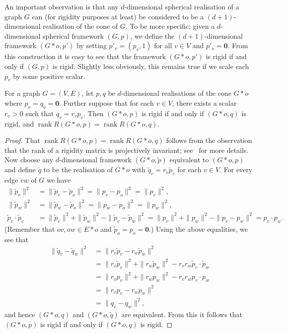 \documentclass[ALCO]{cedram}
\DeclareMathOperator{\rank}{rank}
\begin{document}
An important observation is that any $d$-dimensional spherical realisation of a graph $G$ can (for rigidity purposes at least) be considered to be a $(d+1)$-dimensional realisation of the cone of $G$.
To be more specific:
given a $d$-dimensional spherical framework $(G,p)$,
we define the $(d+1)$-dimensional framework $(G*o,p')$ by setting $p'_v=(p_v,1)$ for all $v \in V$ and $p'_o = \mathbf{0}$.
From this construction it is easy to see that the framework $(G*o,p')$ is rigid if and only if $(G,p)$ is rigid.
Slightly less obviously,
this remains true if we scale each $p_v$ by some positive scalar.

\begin{proposition}\label{p:slide}
	For a graph $G=(V,E)$,
	let $p,q$ be $d$-dimensional realisations of the cone $G*o$ where $p_o=q_o = \mathbf{0}$.
	Further suppose that for each $v \in V$,
	there exists a scalar $r_v >0$ such that $q_v = r_v p_v$.
	Then $(G*o,p)$ is rigid if and only if $(G*o,q)$ is rigid,
	and $\rank R(G*o,p) = \rank R(G*o,q)$.
\end{proposition}

\begin{proof}
	That $\rank R(G*o,p) = \rank R(G*o,q)$ follows from the observation that the rank of a rigidity matrix is projectively invariant;
	see~\cite[Theorem 1]{Izm09} for more details.
	Now choose any $d$-dimensional framework $(G*o,\tilde{p})$ equivalent to $(G*o,p)$ and define $\tilde{q}$ to be the realisation of $G*o$ with $\tilde{q}_v = r_v \tilde{p}_v$ for each $v \in V$.
	For every edge $vw$ of $G$ we have
	\begin{align*}
		\|\tilde{p}_v\|^2 &= \|\tilde{p}_v - \tilde{p}_o\|^2 = \|p_v - p_o\|^2 = \|p_v\|^2,\\
		\|\tilde{p}_w\|^2 &= \|\tilde{p}_w - \tilde{p}_o\|^2 = \|p_w - p_o\|^2 = \|p_w\|^2,\\
		\tilde{p}_v \cdot \tilde{p}_v &=  \|\tilde{p}_v\|^2 + \|\tilde{p}_w\|^2 - \| \tilde{p}_v - \tilde{p}_w\|^2= \|p_v\|^2 + \|p_w\|^2 - \| p_v - p_w\|^2 = p_v \cdot p_w.
	\end{align*}
	(Remember that $ov , ow \in E*o$ and $\tilde{p}_o = p_o = \mathbf{0}$.)
	Using the above equalities,
	we see that
	\begin{align*}
		\|\tilde{q}_v-\tilde{q}_w\|^2 &= \|r_v\tilde{p}_v-r_w\tilde{p}_w\|^2 \\
		&= \|r_v\tilde{p}_v\|^2 + \|r_w\tilde{p}_w\|^2 - r_v r_w\tilde{p}_v \cdot \tilde{p}_w \\
		&= \|r_vp_v\|^2 + \|r_wp_w\|^2 - r_v r_wp_v \cdot p_w  \\
		&= \|r_vp_v-r_wp_w\|^2 \\
		&= \|q_v-q_w\|^2,
	\end{align*}
	and hence $(G*o,q)$ and $(G*o,\tilde{q})$ are equivalent.
	From this it follows that $(G*o,p)$ is rigid if and only if $(G*o,q)$ is rigid.
\end{proof}
\end{document}

